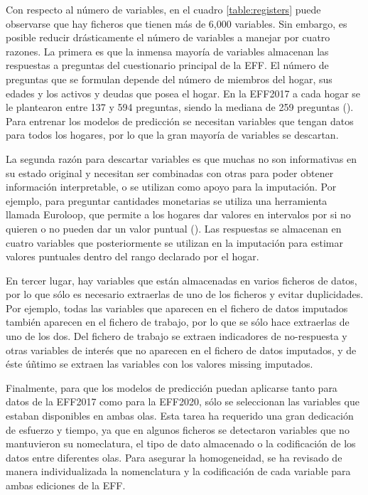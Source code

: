 Con respecto al número de variables, en el cuadro \ref{table:registers} puede observarse que hay ficheros que tienen más de 6,000 variables. Sin embargo, es posible reducir drásticamente el número de variables a manejar por cuatro razones. La primera es que la inmensa mayoría de variables almacenan las respuestas a preguntas del cuestionario principal de la EFF. El número de preguntas que se formulan depende del número de miembros del hogar, sus edades y los activos y deudas que posea el hogar. En la EFF2017 a cada hogar se le plantearon entre 137 y 594 preguntas, siendo la mediana de 259 preguntas (\cite{effmethod2017}). Para entrenar los modelos de predicción se necesitan variables que tengan datos para todos los hogares, por lo que la gran mayoría de variables se descartan.

La segunda razón para descartar variables es que muchas no son informativas en su estado original y necesitan ser combinadas con otras para poder obtener información interpretable, o se utilizan como apoyo para la imputación. Por ejemplo, para preguntar cantidades monetarias se utiliza una herramienta llamada Euroloop, que permite a los hogares dar valores en intervalos por si no quieren o no pueden dar un valor puntual (\cite{effmethod2017}). Las respuestas se almacenan en cuatro variables que posteriormente se utilizan en la imputación para estimar valores puntuales dentro del rango declarado por el hogar.

En tercer lugar, hay variables que están almacenadas en varios ficheros de datos, por lo que sólo es necesario extraerlas de uno de los ficheros y evitar duplicidades. Por ejemplo, todas las variables que aparecen en el fichero de datos imputados también aparecen en el fichero de trabajo, por lo que se sólo hace extraerlas de uno de los dos. Del fichero de trabajo se extraen indicadores de no-respuesta y otras variables de interés que no aparecen en el fichero de datos imputados, y de éste úñtimo se extraen las variables con los valores missing imputados.

Finalmente, para que los modelos de predicción puedan aplicarse tanto para datos de la EFF2017 como para la EFF2020, sólo se seleccionan las variables que estaban disponibles en ambas olas. Esta tarea ha requerido una gran dedicación de esfuerzo y tiempo, ya que en algunos ficheros se detectaron variables que no mantuvieron su nomeclatura, el tipo de dato almacenado o la codificación de los datos entre diferentes olas. Para asegurar la homogeneidad, se ha revisado de manera individualizada la nomenclatura y la codificación de cada variable para ambas ediciones de la EFF.

